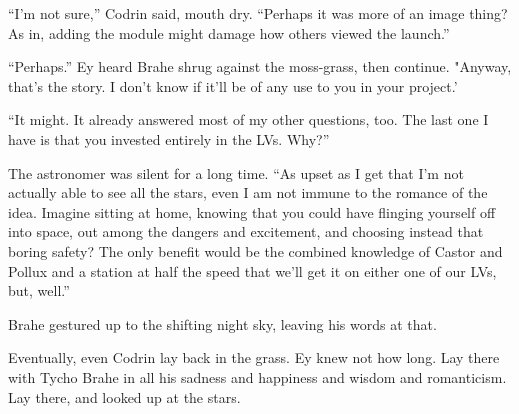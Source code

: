 ``I'm not sure,'' Codrin said, mouth dry. ``Perhaps it was more of an image thing? As in, adding the module might damage how others viewed the launch.''

``Perhaps.'' Ey heard Brahe shrug against the moss-grass, then continue. "Anyway, that's the story. I don't know if it'll be of any use to you in your project.'

``It might. It already answered most of my other questions, too. The last one I have is that you invested entirely in the LVs. Why?''

The astronomer was silent for a long time. ``As upset as I get that I'm not actually able to see all the stars, even I am not immune to the romance of the idea. Imagine sitting at home, knowing that you could have flinging yourself off into space, out among the dangers and excitement, and choosing instead that boring safety? The only benefit would be the combined knowledge of Castor and Pollux and a station at half the speed that we'll get it on either one of our LVs, but, well.''

Brahe gestured up to the shifting night sky, leaving his words at that.

Eventually, even Codrin lay back in the grass. Ey knew not how long. Lay there with Tycho Brahe in all his sadness and happiness and wisdom and romanticism. Lay there, and looked up at the stars.
